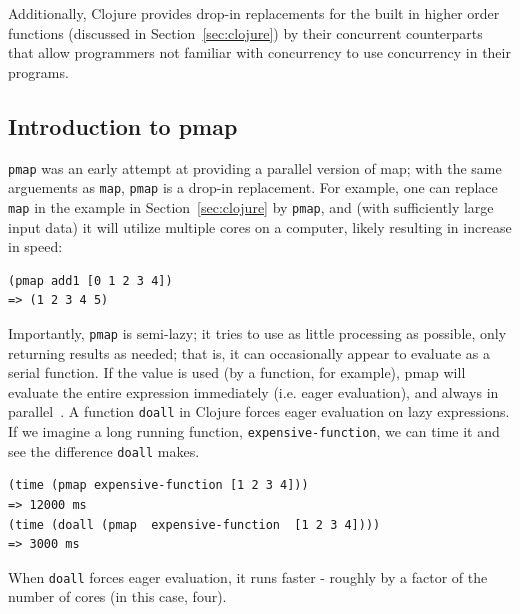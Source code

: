 \documentclass[12pt]{article}
\newcommand{\comment}[1]{{\bf \tt  {#1}}}
\newcommand{\emcomment}[1]{\textcolor{ForestGreen}{\comment{Elena: {#1}}}}
\newcommand{\hfcomment}[1]{\textcolor{Teal}{\comment{Henry: {#1}}}}
\newcommand{\clocode}[1]{{\texttt {#1}}}
\begin{document}
Additionally, Clojure provides drop-in replacements for the built in higher order functions (discussed in Section~\ref{sec:clojure}) by their concurrent counterparts that allow programmers not familiar with concurrency to use concurrency in their programs.


\subsection{Introduction to pmap}\label{sec:pmap}
\clocode{pmap} was an early attempt at providing a parallel version of map; with the same arguements as \clocode{map}, \clocode{pmap} is a drop-in replacement. For example, one can replace \clocode{map} in the example in Section~\ref{sec:clojure} by \clocode{pmap}, and (with sufficiently large input data) it will utilize multiple cores on a computer, likely resulting in increase in speed:   
\begin{verbatim}
(pmap add1 [0 1 2 3 4])
=> (1 2 3 4 5)
\end{verbatim}
Importantly, \clocode{pmap} is semi-lazy; it tries to use as little processing as possible, only returning results as needed; that is, it can occasionally appear to evaluate as a serial function. %
If the value is used (by a function, for example), pmap will evaluate the entire expression immediately (i.e. eager evaluation), and always %
 in parallel~\cite{Pmap}. A function \clocode{doall} in Clojure forces eager evaluation on lazy expressions. 
If we imagine a long running function, \clocode{expensive-function}, we can time it and see the difference \clocode{doall} makes.
\begin{verbatim}
(time (pmap expensive-function [1 2 3 4]))
=> 12000 ms 
(time (doall (pmap  expensive-function  [1 2 3 4])))
=> 3000 ms
\end{verbatim}
When \clocode{doall} forces eager evaluation, it runs faster - roughly by a factor of the number of cores (in this case, four).
\end{document}

